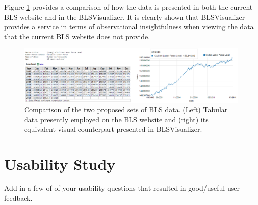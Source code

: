 \documentclass{sigchi}
\begin{document}
{Figure \ref{TablePlot} provides a comparison of how the data is presented in both the current BLS website and in the BLSVisualizer. It is clearly shown that BLSVisualizer provides a service in terms of observational insightfulness when viewing the data that the current BLS website does not provide.}

\begin{figure}[t]
\centering
    \includegraphics[width = 6.2in]{figures/PlotTable.png}
    \caption{Comparison of the two proposed sets of BLS data. (Left) Tabular data presently employed on the BLS website and (right) its equivalent visual counterpart presented in BLSVisualizer.}
    \label{TablePlot}
\end{figure}


\section{Usability Study}
Add in a few of of your usability questions that resulted in good/useful user feedback.
\end{document}

